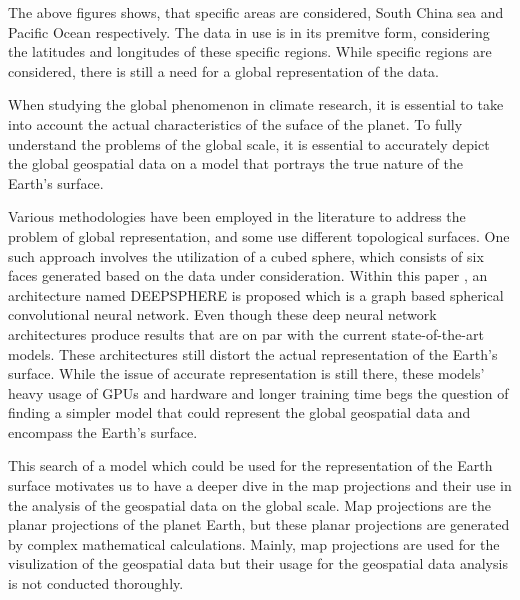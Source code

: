 The above figures shows, that specific areas are considered, South China sea and Pacific Ocean respectively. The data in use is in its premitve form, considering the latitudes and longitudes of these specific regions. While specific regions are considered, there is still a need for a global representation of the data.

When studying the global phenomenon in climate research, it is essential to take into account the actual characteristics of the suface of the planet. To fully understand the problems of the global scale, it is essential to accurately depict the global geospatial data on a model that portrays the true nature of the Earth's surface.

Various methodologies have been employed in the literature to address the problem of global representation, and some use different topological surfaces. One such approach \cite{Weyn_2020} involves the utilization of a cubed sphere, which consists of six faces generated based on the data under consideration.
Within this paper \cite{DBLP:journals/corr/abs-2012-15000}, an architecture named DEEPSPHERE is proposed which is a graph based spherical convolutional neural network.
Even though these deep neural network architectures produce results that are on par with the current state-of-the-art models. These architectures still distort the actual representation of the Earth's surface.
While the issue of accurate representation is still there, these models' heavy usage of GPUs and hardware and longer training time begs the question of finding a simpler model that could represent the global geospatial data and encompass the Earth's surface.

This search of a model which could be used for the representation of the Earth surface motivates us to have a deeper dive in the map projections and their use in the analysis of the geospatial data on the global scale. Map projections are the planar projections of the planet Earth, but these planar projections are generated by complex mathematical calculations. Mainly, map projections are used for the visulization of the geospatial data but their usage for the geospatial data analysis is not conducted thoroughly.


